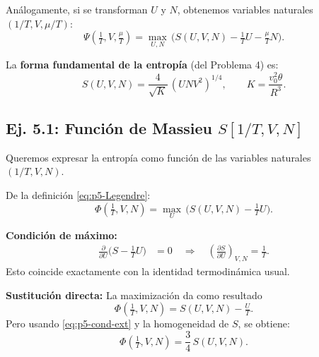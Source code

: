 \documentclass{article}
\begin{document}
Análogamente, si se transforman \(U\) y \(N\), obtenemos variables naturales 
\((1/T,V,\mu/T)\):
\begin{equation}
\Psi\!\left(\tfrac{1}{T},V,\tfrac{\mu}{T}\right)
= \max_{U,N}\,\Big(S(U,V,N)-\tfrac{1}{T}U-\tfrac{\mu}{T}N\Big).
\label{eq:p5-Legendre-doble}
\end{equation}

\medskip
La \textbf{forma fundamental de la entropía} (del Problema 4) es:
\begin{equation}
S(U,V,N)=\frac{4}{\sqrt{K}}\,(U N V^{2})^{1/4},
\qquad
K=\frac{v_{0}^{2}\theta}{R^{3}}.
\label{eq:p5-Sfund}
\end{equation}

\subsection*{Ej. 5.1: Función de Massieu $S[1/T,V,N]$}

Queremos expresar la entropía como función de las variables naturales 
\((1/T,V,N)\).  

De la definición \eqref{eq:p5-Legendre}:
\begin{equation}
\Phi\!\left(\tfrac{1}{T},V,N\right)
= \max_{U}\,\Big(S(U,V,N)-\tfrac{1}{T}U\Big).
\label{eq:p5-phi-def}
\end{equation}

\textbf{Condición de máximo:}
\begin{equation}
\begin{split}
\frac{\partial}{\partial U}\Big(S-\tfrac{1}{T}U\Big)&=0
\quad\Longrightarrow\quad
\left(\frac{\partial S}{\partial U}\right)_{V,N}=\frac{1}{T}.
\end{split}
\label{eq:p5-cond-ext}
\end{equation}
Esto coincide exactamente con la identidad termodinámica usual.

\medskip
\textbf{Sustitución directa:}  
La maximización da como resultado
\begin{equation}
\Phi\!\left(\tfrac{1}{T},V,N\right)=S(U,V,N)-\tfrac{U}{T}.
\label{eq:p5-phi-S}
\end{equation}
Pero usando \eqref{eq:p5-cond-ext} y la homogeneidad de \(S\), se obtiene:
\begin{equation}
\Phi\!\left(\tfrac{1}{T},V,N\right)=\frac{3}{4}\,S(U,V,N).
\label{eq:p5-phi-res}
\end{equation}
\end{document}

